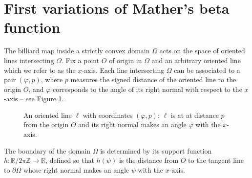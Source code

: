 \documentclass[a4paper]{article}
\theoremstyle{definition}
\def\R{\mathbb{R}}
\def\Z{\mathbb{Z}}
\begin{document}
\section{First variations of Mather's beta function}

The billiard map inside a strictly convex domain $\Omega$ acts on the space of oriented lines intersecting $\Omega$. 
Fix a point $O$ of origin in $\Omega$ and an arbitrary oriented line which we refer to as the $x$-axis.
Each line intersecting $\Omega$ can be associated to a pair $(\varphi, p)$, where $p$ measures the signed distance of the oriented line to the origin $O$, and $\varphi$ corresponds to the angle of its right normal with respect to the $x$-axis -- see Figure \ref{fig:oriented_line}. 

\begin{figure}[h!]
    \centering
    \caption{An oriented line $\ell$ with coordinates $(\varphi,p)$: $\ell$ is at at distance $p$ from the origin $O$ and its right normal makes an angle $\varphi$ with the $x$-axis.}
    \label{fig:oriented_line}
\end{figure}

The boundary of the domain $\Omega$ is determined by its support function $h:\R/2\pi\Z\to\R$, defined so that $h(\psi)$ is the distance from $O$ to the tangent line to $\partial\Omega$ whose right normal makes an angle $\psi$ with the $x$-axis.
\end{document}
